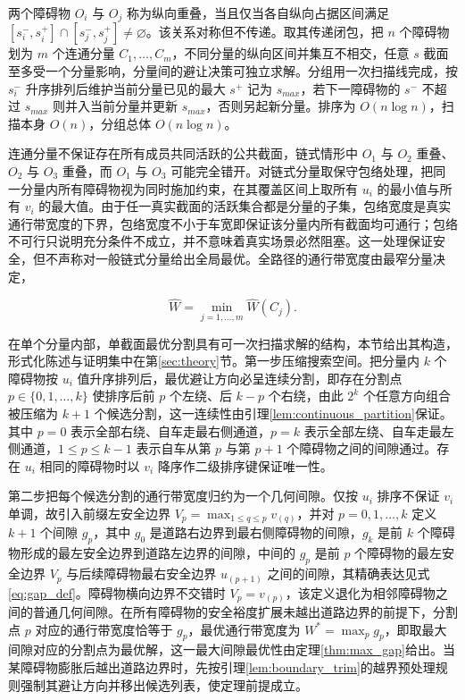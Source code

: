 \documentclass[a4paper,11pt]{ctexart}
\theoremstyle{definition}
\begin{document}
两个障碍物 $O_i$ 与 $O_j$ 称为纵向重叠，当且仅当各自纵向占据区间满足 $[s_i^{-}, s_i^{+}] \cap [s_j^{-}, s_j^{+}] \neq \varnothing$。该关系对称但不传递。取其传递闭包，把 $n$ 个障碍物划为 $m$ 个连通分量 $C_1, \ldots, C_m$，不同分量的纵向区间并集互不相交，任意 $s$ 截面至多受一个分量影响，分量间的避让决策可独立求解。分组用一次扫描线完成，按 $s_i^{-}$ 升序排列后维护当前分量已见的最大 $s^{+}$ 记为 $s_{max}$，若下一障碍物的 $s^{-}$ 不超过 $s_{max}$ 则并入当前分量并更新 $s_{max}$，否则另起新分量。排序为 $O(n\log n)$，扫描本身 $O(n)$，分组总体 $O(n\log n)$。

连通分量不保证存在所有成员共同活跃的公共截面，链式情形中 $O_1$ 与 $O_2$ 重叠、$O_2$ 与 $O_3$ 重叠，而 $O_1$ 与 $O_3$ 可能完全错开。对链式分量取保守包络处理，把同一分量内所有障碍物视为同时施加约束，在其覆盖区间上取所有 $u_i$ 的最小值与所有 $v_i$ 的最大值。由于任一真实截面的活跃集合都是分量的子集，包络宽度是真实通行带宽度的下界，包络宽度不小于车宽即保证该分量内所有截面均可通行；包络不可行只说明充分条件不成立，并不意味着真实场景必然阻塞。这一处理保证安全，但不声称对一般链式分量给出全局最优。全路径的通行带宽度由最窄分量决定，

\begin{equation}
    \hat{W} = \min_{j=1,\ldots,m} \hat{W}(C_j).
    \label{eq:global_width}
\end{equation}

在单个分量内部，单截面最优分割具有可一次扫描求解的结构，本节给出其构造，形式化陈述与证明集中在第\ref{sec:theory}节。第一步压缩搜索空间。把分量内 $k$ 个障碍物按 $u_i$ 值升序排列后，最优避让方向必呈连续分割，即存在分割点 $p\in\{0,1,\ldots,k\}$ 使排序后前 $p$ 个左绕、后 $k-p$ 个右绕，由此 $2^k$ 个任意方向组合被压缩为 $k+1$ 个候选分割，这一连续性由引理\ref{lem:continuous_partition}保证。其中 $p=0$ 表示全部右绕、自车走最右侧通道，$p=k$ 表示全部左绕、自车走最左侧通道，$1\leq p\leq k-1$ 表示自车从第 $p$ 与第 $p+1$ 个障碍物之间的间隙通过。存在 $u_i$ 相同的障碍物时以 $v_i$ 降序作二级排序键保证唯一性。

第二步把每个候选分割的通行带宽度归约为一个几何间隙。仅按 $u_i$ 排序不保证 $v_i$ 单调，故引入前缀左安全边界 $V_p=\max_{1\leq q\leq p} v_{(q)}$，并对 $p=0,1,\ldots,k$ 定义 $k+1$ 个间隙 $g_p$，其中 $g_0$ 是道路右边界到最右侧障碍物的间隙，$g_k$ 是前 $k$ 个障碍物形成的最左安全边界到道路左边界的间隙，中间的 $g_p$ 是前 $p$ 个障碍物的最左安全边界 $V_p$ 与后续障碍物最右安全边界 $u_{(p+1)}$ 之间的间隙，其精确表达见式\eqref{eq:gap_def}。障碍物横向边界不交错时 $V_p=v_{(p)}$，该定义退化为相邻障碍物之间的普通几何间隙。在所有障碍物的安全裕度扩展未越出道路边界的前提下，分割点 $p$ 对应的通行带宽度恰等于 $g_p$，最优通行带宽度为 $W^{*}=\max_{p} g_p$，即取最大间隙对应的分割点为最优解，这一最大间隙最优性由定理\ref{thm:max_gap}给出。当某障碍物膨胀后越出道路边界时，先按引理\ref{lem:boundary_trim}的越界预处理规则强制其避让方向并移出候选列表，使定理前提成立。
\end{document}
